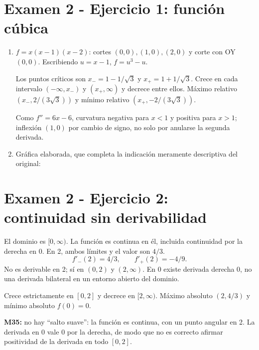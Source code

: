 \documentclass[11pt]{article}
\begin{document}
\section*{Examen 2 - Ejercicio 1: función cúbica}
\begin{enumerate}[label=(\alph*)]
\item $f=x(x-1)(x-2)$: cortes $(0,0),(1,0),(2,0)$ y corte con OY $(0,0)$. Escribiendo $u=x-1$, $f=u^3-u$.

Los puntos críticos son $x_-=1-1/\sqrt3$ y $x_+=1+1/\sqrt3$. Crece en cada intervalo $(-\infty,x_-)$ y $(x_+,\infty)$ y decrece entre ellos. Máximo relativo $(x_-,2/(3\sqrt3))$ y mínimo relativo $(x_+,-2/(3\sqrt3))$.

Como $f''=6x-6$, curvatura negativa para $x<1$ y positiva para $x>1$; inflexión $(1,0)$ por cambio de signo, no solo por anularse la segunda derivada.
\item Gráfica elaborada, que completa la indicación meramente descriptiva del original:
\end{enumerate}
\begin{center}\end{center}
\clearpage
\section*{Examen 2 - Ejercicio 2: continuidad sin derivabilidad}
El dominio es $[0,\infty)$. La función es continua en él, incluida continuidad por la derecha en 0. En 2, ambos límites y el valor son $4/3$.
\[
f'_-(2)=4/3,\qquad f'_+(2)=-4/9.
\]
No es derivable en 2; sí en $(0,2)$ y $(2,\infty)$. En 0 existe derivada derecha 0, no una derivada bilateral en un entorno abierto del dominio.

Crece estrictamente en $[0,2]$ y decrece en $[2,\infty)$. Máximo absoluto $\boxed{(2,4/3)}$ y mínimo absoluto $f(0)=0$.

\textbf{M35:} no hay ``salto suave'': la función es continua, con un punto angular en 2. La derivada en 0 vale 0 por la derecha, de modo que no es correcto afirmar positividad de la derivada en todo $[0,2]$.
\begin{center}\end{center}
\clearpage
\end{document}
